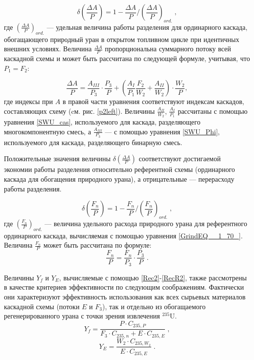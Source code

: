 \begin{equation} \label{DeltaA} 
    \delta(\frac{\Delta A}{P})=1-\frac{\Delta A}{P}/(\frac{\Delta A}{P})_{ord.} \; ,
\end{equation}
где $(\frac{\Delta A}{P})_{ord.}$ --- удельная величина работы разделения для ординарного каскада, обогащающего природный уран в открытом топливном цикле при идентичных внешних условиях. Величина $\frac{\Delta A}{P}$ пропорциональна суммарного потоку всей каскадной схемы и может быть рассчитана по следующей формуле, учитывая, что ${P_1}={F_2}$:

\begin{equation} \label{DeltaAP}
  \frac{\Delta A}{P} = \frac{A_{III}}{P_3} \cdot \frac{P_3}{P}+\left(\frac{A_I}{P_1} \frac{F_2}{W_2}+\frac{A_{II}}{W_2}\right) \cdot \frac{W_2}{P},
\end{equation}
где индексы при $A$ в правой части уравнения соответствуют индексам каскадов, составляющих схему (cм. рис. \ref{p2left}). Величины $\frac{A_{II}}{W_2}$, $\frac{A_I}{P_1}$ рассчитаны с помощью уравнения \ref{SWU_cas}, используемого для каскада, разделяющего многокомпонентную смесь, а $\frac{A_{III}}{P_3}$ --- с помощью уравнения \ref{SWU_Phi}, используемого для каскада, разделяющего бинарную смесь.

Положительные значения величины $\delta(\frac{\Delta A}{P})$ соответствуют достигаемой экономии работы разделения относительно референтной схемы (ординарного каскада для обогащения природного урана), а отрицательные --- перерасходу работы разделения.

\begin{equation} \label{DeltaFnu} 
    \delta(\frac{F_n}{P})=1-\frac{F_n}{P}/(\frac{F_n}{P})_{ord.} \; ,
\end{equation} 
где $(\frac{F_n}{P})_{ord.}$ --- величина удельного расхода природного урана для референтного ординарного каскада, вычисляемая с помощью уравнения \ref{GrindEQ__1_70_}. Величина $\frac{F_n}{P}$ может быть рассчитана по формуле:
\begin{equation} \label{Delta_Fnu}
    \frac{F_n}{P} = \frac{F_n}{P_3} \cdot \frac{P_3}{P} \; .
\end{equation}

Величины $Y_f$ и $Y_{E}$, вычисляемые с помощью \ref{Rec2}-\ref{RecR2}, также рассмотрены в качестве критериев эффективности по следующим соображениям. Фактически они характеризуют эффективность использования как всех сырьевых материалов каскадной схемы (потоки $E$ и $F_3$), так и отдельно из обогащаемого регенерированного урана с точки зрения извлечения $^{235}$U.
\begin{equation} \label{Rec2} 
    Y_f = \frac{P \cdot C_{235,P}}{F_3 \cdot C_{235,n} + E \cdot C_{235,E}} \; , 
\end{equation} 
\begin{equation} \label{RecR2} 
    Y_{E} = \frac{W_2\cdot C_{235,W_2}}{E \cdot C_{235,E}}  \; .    
\end{equation} 

